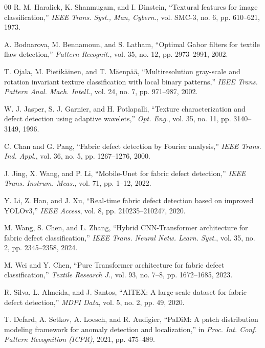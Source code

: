 \documentclass[journal]{IEEEtran}
\begin{document}
\begin{thebibliography}{00}
R. M. Haralick, K. Shanmugam, and I. Dinstein, ``Textural features for image classification,'' \textit{IEEE Trans. Syst., Man, Cybern.}, vol. SMC-3, no. 6, pp. 610--621, 1973.

A. Bodnarova, M. Bennamoun, and S. Latham, ``Optimal Gabor filters for textile flaw detection,'' \textit{Pattern Recognit.}, vol. 35, no. 12, pp. 2973--2991, 2002.

T. Ojala, M. Pietik\"ainen, and T. M\"aenp\"a\"a, ``Multiresolution gray-scale and rotation invariant texture classification with local binary patterns,'' \textit{IEEE Trans. Pattern Anal. Mach. Intell.}, vol. 24, no. 7, pp. 971--987, 2002.

W. J. Jasper, S. J. Garnier, and H. Potlapalli, ``Texture characterization and defect detection using adaptive wavelets,'' \textit{Opt. Eng.}, vol. 35, no. 11, pp. 3140--3149, 1996.

C. Chan and G. Pang, ``Fabric defect detection by Fourier analysis,'' \textit{IEEE Trans. Ind. Appl.}, vol. 36, no. 5, pp. 1267--1276, 2000.

J. Jing, X. Wang, and P. Li, ``Mobile-Unet for fabric defect detection,'' \textit{IEEE Trans. Instrum. Meas.}, vol. 71, pp. 1--12, 2022.

Y. Li, Z. Han, and J. Xu, ``Real-time fabric defect detection based on improved YOLOv3,'' \textit{IEEE Access}, vol. 8, pp. 210235--210247, 2020.

M. Wang, S. Chen, and L. Zhang, ``Hybrid CNN-Transformer architecture for fabric defect classification,'' \textit{IEEE Trans. Neural Netw. Learn. Syst.}, vol. 35, no. 2, pp. 2345--2358, 2024.

M. Wei and Y. Chen, ``Pure Transformer architecture for fabric defect classification,'' \textit{Textile Research J.}, vol. 93, no. 7--8, pp. 1672--1685, 2023.

R. Silva, L. Almeida, and J. Santos, ``AITEX: A large-scale dataset for fabric defect detection,'' \textit{MDPI Data}, vol. 5, no. 2, pp. 49, 2020.

T. Defard, A. Setkov, A. Loesch, and R. Audigier, ``PaDiM: A patch distribution modeling framework for anomaly detection and localization,'' in \textit{Proc. Int. Conf. Pattern Recognition (ICPR)}, 2021, pp. 475--489.


\end{thebibliography}
\end{document}
